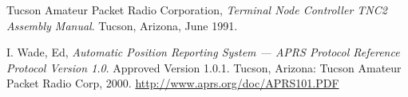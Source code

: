 \begin{thebibliography}{99}
		Tucson Amateur Packet Radio Corporation,
		\emph{Terminal Node Controller TNC2 Assembly Manual}.
		Tucson, Arizona,
		June 1991.

		I. Wade, Ed,
		\emph{Automatic Position Reporting System --- 
		APRS Protocol Reference Protocol Version 1.0}.
		Approved Version 1.0.1.
		Tucson, Arizona: Tucson Amateur Packet Radio Corp, 2000. 
		\url{http://www.aprs.org/doc/APRS101.PDF}


\end{thebibliography}

